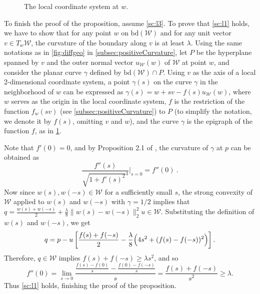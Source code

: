 \documentclass[english]{article}
\newcommand{\cW}{\mathcal{W}}
\newcommand{\bd}{\mathrm{bd}}
\newcommand{\ra}{\rightarrow}
\newenvironment{proofof}[1]{\par\noindent{\bf Proof of #1\ }}{\hfill\BlackBox\\[2mm]}
\begin{document}
\begin{proofof}{\cref{prop:strongconvex}}
\begin{figure}
\begin{framed}
		\caption{The local coordinate system at $w$. \label{fig:stronglyconvexset}}
	\end{framed}
	\vspace{-0.5cm}
\end{figure}

To finish the proof of the proposition, assume \eqref{sc:l3}. To prove that \eqref{sc:l1} holds, we have to show that for any point $w$ on $\bd(\cW)$ and for any unit vector $v \in T_w\cW$, the curvature of the boundary along $v$ is at least $\lambda$.
Using the same notations as in \cref{fig:diffgeo} in \cref{subsec:positiveCurvature}, 
let $P$ be the hyperplane spanned by $v$ and the outer normal vector $u_{\cW}(w)$ of $\cW$ at point $w$, and consider the planar curve $\gamma$ defined by $\bd(\cW) \cap P$.
Using $v$ as the axis of a local 2-dimensional coordinate system, a point $\gamma(s)$ on the curve $\gamma$ in the neighborhood of $w$ can be expressed as $\gamma(s) = w + sv - f(s)u_{\cW}(w)$, where $w$ serves as the origin in the local coordinate system, $f$ is the restriction of the function $f_w(sv)$ (see \cref{subsec:positiveCurvature}) to $P$ (to simplify the notation, we denote it by $f(s)$, omitting $v$ and $w$), and the curve $\gamma$ is the epigraph of the function $f$, as in \cref{fig:stronglyconvexset}.

Note that $f'(0)=0$, and by Proposition 2.1 of \citet{pressley2010elementary}, the curvature of $\gamma$ at $p$ can be obtained as 
\[
\frac{f''(s)}{\sqrt{1+f'(s)^2}^3}\Bigg\vert_{s=0} = f''(0)~.
\]
Now since $w(s),w(-s) \in \cW$ for a sufficiently small $s$, the strong convexity of $\cW$ applied to $w(s)$ and $w(-s)$ with $\gamma=1/2$
implies that $q=\frac{w(s)+w(-s)}{2}+\frac{\lambda}{8} \|w(s)-w(-s)\|_2^2 u \in \cW$. Substituting the definition of $w(s)$ and $w(-s)$, we get
\[
q=p - u \left[\frac{f(s)+f(-s)}{2} - \frac{\lambda}{8} \Bigl(4s^2 + (f(s)-f(-s))^2\Bigr)\right].
\]
Therefore, $q \in \cW$ implies
$f(s)+f(-s) \ge \lambda s^2$, and so
\[
	f''(0) = \lim_{s \ra 0} \frac{\frac{f(s) - f(0)}{s} - \frac{f(0) - f(-s)}{s}}{s} = \frac{f(s)+ f(-s)}{s^2} \ge \lambda.
\]
Thus \eqref{sc:l1} holds, finishing the proof of the proposition. 
\end{proofof}
\end{document}
